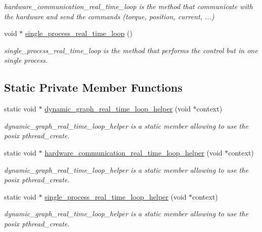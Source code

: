 \begin{DoxyCompactItemize}
\begin{DoxyCompactList}\small\item\em hardware\+\_\+communication\+\_\+real\+\_\+time\+\_\+loop is the method that communicate with the hardware and send the commands (torque, position, current, ...) \end{DoxyCompactList}\item 
void $\ast$ \hyperlink{classdynamic__graph_1_1DynamicGraphManager_adf3adb88c5913b21b51c1f7bfab6d0f3}{single\+\_\+process\+\_\+real\+\_\+time\+\_\+loop} ()
\begin{DoxyCompactList}\small\item\em single\+\_\+process\+\_\+real\+\_\+time\+\_\+loop is the method that performs the control but in one single process. \end{DoxyCompactList}\end{DoxyCompactItemize}
\subsection*{Static Private Member Functions}
\begin{DoxyCompactItemize}
\item 
static void $\ast$ \hyperlink{classdynamic__graph_1_1DynamicGraphManager_a7d289a916922f69796b0042f64de1499}{dynamic\+\_\+graph\+\_\+real\+\_\+time\+\_\+loop\+\_\+helper} (void $\ast$context)
\begin{DoxyCompactList}\small\item\em dynamic\+\_\+graph\+\_\+real\+\_\+time\+\_\+loop\+\_\+helper is a static member allowing to use the posix pthread\+\_\+create. \end{DoxyCompactList}\item 
static void $\ast$ \hyperlink{classdynamic__graph_1_1DynamicGraphManager_a771ad93758759932899273c5f01975fc}{hardware\+\_\+communication\+\_\+real\+\_\+time\+\_\+loop\+\_\+helper} (void $\ast$context)
\begin{DoxyCompactList}\small\item\em dynamic\+\_\+graph\+\_\+real\+\_\+time\+\_\+loop\+\_\+helper is a static member allowing to use the posix pthread\+\_\+create. \end{DoxyCompactList}\item 
static void $\ast$ \hyperlink{classdynamic__graph_1_1DynamicGraphManager_af28f8990655ae8464acb3bd4c56a74c2}{single\+\_\+process\+\_\+real\+\_\+time\+\_\+loop\+\_\+helper} (void $\ast$context)
\begin{DoxyCompactList}\small\item\em dynamic\+\_\+graph\+\_\+real\+\_\+time\+\_\+loop\+\_\+helper is a static member allowing to use the posix pthread\+\_\+create. \end{DoxyCompactList}\end{DoxyCompactItemize}


